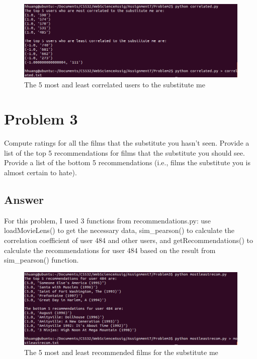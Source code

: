 \documentclass[12pt]{article}
\begin{document}
\begin{figure}[h]
\centering
\includegraphics[width=6.5in]{correlated.png}
\caption{The 5 most and least correlated users to the substitute me}
\end{figure}



\section*{Problem 3}

Compute ratings for all the films that the substitute you
hasn't seen.  Provide a list of the top 5 recommendations for films
that the substitute you should see.  Provide a list of the bottom
5 recommendations (i.e., films the substitute you is almost certain
to hate).

\subsection*{Answer}

For this problem, I used 3 functions from recommendations.py: use loadMovieLens() to get the necessary data, sim\_pearson() to calculate the correlation coefficient of user 484 and other users, and getRecommendations() to calculate the recommendations for user 484 based on the result from sim\_pearson() function. 

\begin{figure}[h]
\centering
\includegraphics[width=6.5in]{mostleastrecom.png}
\caption{The 5 most and least recommended films for the substitute me}
\end{figure}
\end{document}
